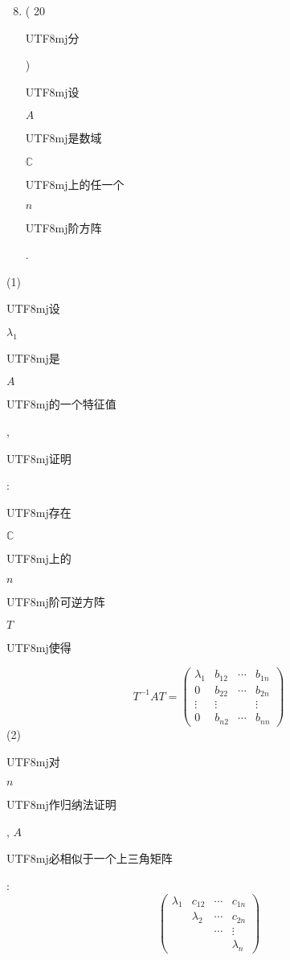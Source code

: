 \documentclass[10pt]{article}
\begin{document}
\begin{enumerate}
  \setcounter{enumi}{7}
  \item ( 20 \begin{CJK}{UTF8}{mj}分\end{CJK}) \begin{CJK}{UTF8}{mj}设\end{CJK} $A$ \begin{CJK}{UTF8}{mj}是数域\end{CJK} $\mathbb{C}$ \begin{CJK}{UTF8}{mj}上的任一个\end{CJK} $n$ \begin{CJK}{UTF8}{mj}阶方阵\end{CJK}.
\end{enumerate}
(1) \begin{CJK}{UTF8}{mj}设\end{CJK} $\lambda_{1}$ \begin{CJK}{UTF8}{mj}是\end{CJK} $A$ \begin{CJK}{UTF8}{mj}的一个特征值\end{CJK}, \begin{CJK}{UTF8}{mj}证明\end{CJK}: \begin{CJK}{UTF8}{mj}存在\end{CJK} $\mathbb{C}$ \begin{CJK}{UTF8}{mj}上的\end{CJK} $n$ \begin{CJK}{UTF8}{mj}阶可逆方阵\end{CJK} $T$ \begin{CJK}{UTF8}{mj}使得\end{CJK}
$$
T^{-1} A T=\left(\begin{array}{cccc}
\lambda_{1} & b_{12} & \cdots & b_{1 n} \\
0 & b_{22} & \cdots & b_{2 n} \\
\vdots & \vdots & & \vdots \\
0 & b_{n 2} & \cdots & b_{n n}
\end{array}\right)
$$
(2) \begin{CJK}{UTF8}{mj}对\end{CJK} $n$ \begin{CJK}{UTF8}{mj}作归纳法证明\end{CJK}, $A$ \begin{CJK}{UTF8}{mj}必相似于一个上三角矩阵\end{CJK}:
$$
\left(\begin{array}{cccc}
\lambda_{1} & c_{12} & \cdots & c_{1 n} \\
& \lambda_{2} & \cdots & c_{2 n} \\
& & \cdots & \vdots \\
& & & \lambda_{n}
\end{array}\right)
$$
\end{document}

